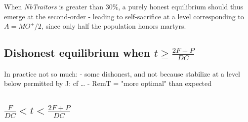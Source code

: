 \documentclass[a4paper,12pt]{report}
\begin{document}
When \emph{NbTraitors} is greater than 30\%, a purely honest equilibrium should thus
emerge at the second-order - leading to self-sacrifice at a level 
corresponding to $A = MO^+ / 2$, since only half the population honors martyrs.


\subsection{Dishonest equilibrium when $t \geq \frac{2F+P}{DC}$}
\label{s:_ESS}



In practice not so much: 
- some dishonest, and not because stabilize at a level below permitted by J: cf \dots
- RemT = "more optimal" than expected






















\subsection{$\frac{F}{DC}<t<\frac{2F+P}{DC}$}



\end{document}
